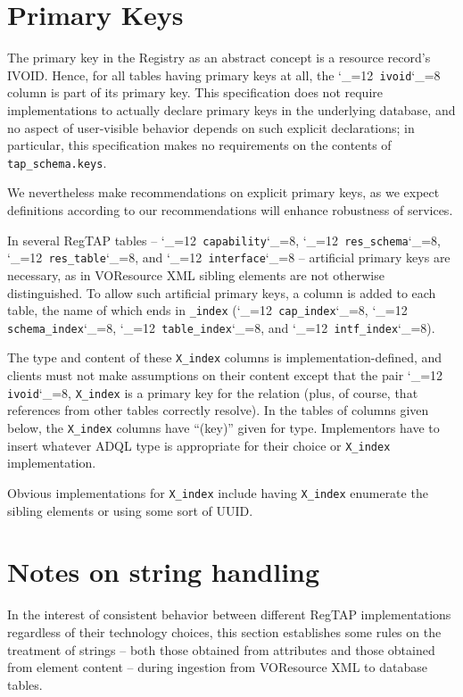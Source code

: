 \documentclass[11pt,a4paper]{ivoa}
\makeatletter
\def\rtent#1{\texttt{\color{rtcolor}\verb|#1|}}
\def\makeunderscoreletter{\catcode`\_=12}
\def\makeunderscoresubscript{\catcode`\_=8}
\def\rtent{\makeunderscoreletter\relax\rt@nt}
\def\rt@nt#1{\texttt{\color{rtcolor} #1}\makeunderscoresubscript{}}
\newcommand{\tapent}[1]{\texttt{\color{tapcolor} #1}}
\makeatother
\begin{document}
\section{Primary Keys}

\label{primarykeys}

The primary key in the Registry as an abstract concept is a resource
record's IVOID.  Hence, for all tables having primary keys at all, the
\rtent{ivoid} column is part of its primary key.  This
specification does not require implementations to actually declare
primary keys in the underlying database, and no aspect of user-visible
behavior depends on such explicit declarations; in particular, this
specification makes no requirements on the contents of
\tapent{tap\_schema.keys}.

We nevertheless make recommendations on explicit primary keys, as
we expect definitions according to our recommendations will enhance
robustness of services.

In several RegTAP tables -- \rtent{capability},
\rtent{res_schema}, \rtent{res_table}, and
\rtent{interface} -- artificial primary keys are necessary, as
in VOResource XML sibling elements are not otherwise distinguished.  To
allow such artificial primary keys, a column is added to each table, the
name of which ends in \texttt{\_index} (\rtent{cap_index},
\rtent{schema_index}, \rtent{table_index}, and
\rtent{intf_index}).

The type and content of these \texttt{X\_index} columns is
implementation-defined, and clients must not make assumptions on their
content except that the pair \rtent{ivoid}, \texttt{X\_index} is a primary
key for the relation (plus, of course, that references from other tables
correctly resolve).  In the tables of columns given below, the
\texttt{X\_index} columns have ``(key)'' given for type.  Implementors
have to insert whatever ADQL type is appropriate for their
choice or \texttt{X\_index} implementation.

Obvious implementations for \texttt{X\_index} include having
\texttt{X\_index} enumerate the sibling elements or using some sort
of UUID.


\section{Notes on string handling}

\label{stringnorm}

In the interest of consistent behavior between different RegTAP
implementations regardless of their technology choices, this section
establishes some rules on the treatment of strings -- both those
obtained from attributes and those obtained from element
content -- during ingestion from VOResource XML to database
tables.
\end{document}
